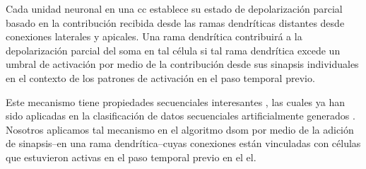 
Cada unidad neuronal en una \gls{cc} establece su estado de depolarización parcial basado en la contribución recibida desde las ramas dendríticas distantes desde conexiones laterales y apicales. Una rama dendrítica contribuirá a la depolarización parcial del soma en tal célula si tal rama dendrítica excede un umbral de activación por medio de la contribución desde sus sinapsis individuales en el contexto de los patrones de activación en el paso temporal previo.


Este mecanismo tiene propiedades secuenciales interesantes \cite{hawkins_2016}, las cuales ya han sido aplicadas en la clasificación de datos secuenciales artificialmente generados \cite{cui_2016}. Nosotros aplicamos tal mecanismo en el algoritmo \gls{dsom} por medio de la adición de sinapsis--en una rama dendrítica--cuyas conexiones están vinculadas con células que estuvieron activas en el paso temporal previo en el \gls{el}. 




















